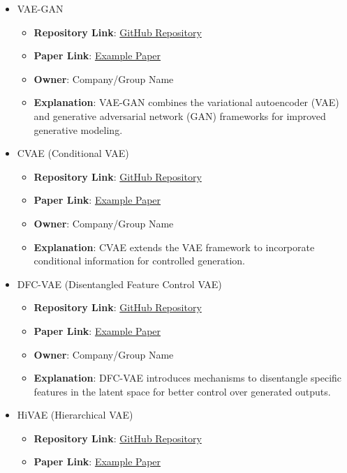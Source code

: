 \documentclass{article}
\begin{document}
{\begin{itemize}
  \item VAE-GAN
    \begin{itemize}
      \item \textbf{Repository Link}: \href{https://github.com/username/vae-gan}{GitHub Repository}
      \item \textbf{Paper Link}: \href{https://arxiv.org/abs/7890.1234}{Example Paper}
      \item \textbf{Owner}: Company/Group Name
      \item \textbf{Explanation}: VAE-GAN combines the variational autoencoder (VAE) and generative adversarial network (GAN) frameworks for improved generative modeling.
    \end{itemize}
  \item CVAE (Conditional VAE)
    \begin{itemize}
      \item \textbf{Repository Link}: \href{https://github.com/username/cvae}{GitHub Repository}
      \item \textbf{Paper Link}: \href{https://arxiv.org/abs/9012.3456}{Example Paper}
      \item \textbf{Owner}: Company/Group Name
      \item \textbf{Explanation}: CVAE extends the VAE framework to incorporate conditional information for controlled generation.
    \end{itemize}
  \item DFC-VAE (Disentangled Feature Control VAE)
    \begin{itemize}
      \item \textbf{Repository Link}: \href{https://github.com/username/dfc-vae}{GitHub Repository}
      \item \textbf{Paper Link}: \href{https://arxiv.org/abs/6789.0123}{Example Paper}
      \item \textbf{Owner}: Company/Group Name
      \item \textbf{Explanation}: DFC-VAE introduces mechanisms to disentangle specific features in the latent space for better control over generated outputs.
    \end{itemize}
  \item HiVAE (Hierarchical VAE)
    \begin{itemize}
      \item \textbf{Repository Link}: \href{https://github.com/username/hivae}{GitHub Repository}
      \item \textbf{Paper Link}: \href{https://arxiv.org/abs/3456.7890}{Example Paper}

\end{itemize}
\end{itemize}}
\end{document}
